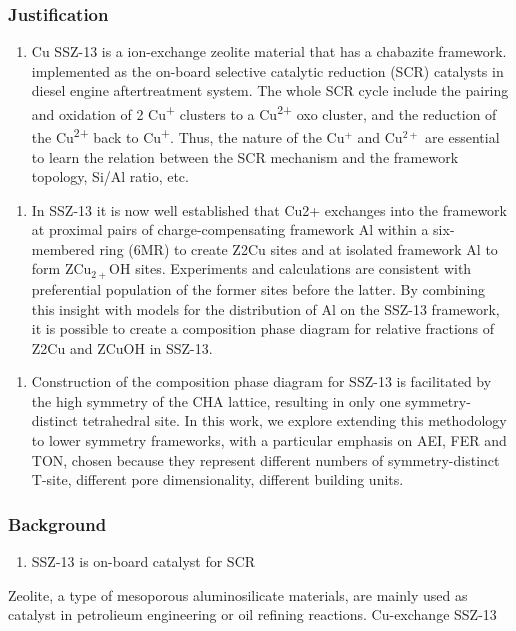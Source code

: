 \documentclass[12pt]{article}
\begin{document}
\subsubsection*{Justification}
\begin{enumerate}
\item Cu SSZ-13 is a ion-exchange zeolite material that has a chabazite framework. implemented as the on-board selective catalytic reduction (SCR) catalysts in diesel engine aftertreatment system. The whole SCR cycle include the pairing and oxidation of 2 Cu\textsuperscript{+} clusters to a Cu\textsuperscript{2+} oxo cluster, and the reduction of the Cu\textsuperscript{2+} back to Cu\textsuperscript{+}. Thus, the nature of the Cu$^{+}$ and Cu$^{2+}$ are essential to learn the relation between the SCR mechanism and the framework topology, Si/Al ratio, etc.
\end{enumerate}

\begin{enumerate}
\item In SSZ-13 it is now well established that Cu2+ exchanges into the framework at proximal pairs of charge-compensating framework Al within a six-membered ring (6MR) to create Z2Cu sites and at isolated framework Al to form ZCu$_{2+}$OH sites.\cite{Paolucci2016}  Experiments and calculations are consistent with preferential population of the former sites before the latter. By combining this insight with models for the distribution of Al on the SSZ-13 framework, it is possible to create a composition phase diagram for relative fractions of Z2Cu and ZCuOH in SSZ-13.\cite{Paolucci2016}
\end{enumerate}

\begin{enumerate}
\item Construction of the composition phase diagram for SSZ-13 is facilitated by the high symmetry of the CHA lattice, resulting in only one symmetry-distinct tetrahedral site. In this work, we explore extending this  methodology to lower symmetry frameworks, with a particular emphasis on AEI, FER and TON, chosen because they represent different numbers of symmetry-distinct T-site, different pore dimensionality, different building units.
\end{enumerate}

\subsubsection*{Background}
\begin{enumerate}
\item SSZ-13 is on-board catalyst for SCR
\end{enumerate}
Zeolite, a type of mesoporous aluminosilicate materials, are mainly used as catalyst in petrolieum engineering or oil refining reactions. Cu-exchange SSZ-13
 
\end{document}
